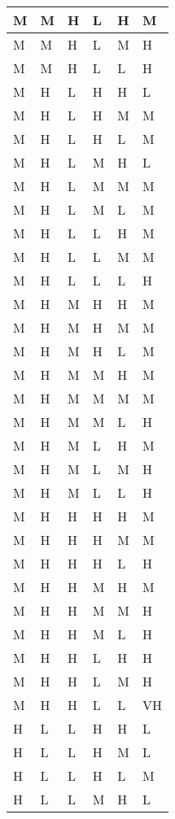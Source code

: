 \begin{center}
\begin{longtable}{| l | l | l | l | l | l |}
    M & M & H & L & H & M \\ \hline 
    M & M & H & L & M & H \\ \hline 
    M & M & H & L & L & H \\ \hline 
    M & H & L & H & H & L \\ \hline 
    M & H & L & H & M & M \\ \hline 
    M & H & L & H & L & M \\ \hline 
    M & H & L & M & H & L \\ \hline 
    M & H & L & M & M & M \\ \hline 
    M & H & L & M & L & M \\ \hline 
    M & H & L & L & H & M \\ \hline 
    M & H & L & L & M & M \\ \hline 
    M & H & L & L & L & H \\ \hline 
    M & H & M & H & H & M \\ \hline 
    M & H & M & H & M & M \\ \hline 
    M & H & M & H & L & M \\ \hline 
    M & H & M & M & H & M \\ \hline 
    M & H & M & M & M & M \\ \hline 
    M & H & M & M & L & H \\ \hline 
    M & H & M & L & H & M \\ \hline 
    M & H & M & L & M & H \\ \hline 
    M & H & M & L & L & H \\ \hline 
    M & H & H & H & H & M \\ \hline 
    M & H & H & H & M & M \\ \hline 
    M & H & H & H & L & H \\ \hline 
    M & H & H & M & H & M \\ \hline 
    M & H & H & M & M & H \\ \hline 
    M & H & H & M & L & H \\ \hline 
    M & H & H & L & H & H \\ \hline 
    M & H & H & L & M & H \\ \hline 
    M & H & H & L & L & VH \\ \hline 
    H & L & L & H & H & L \\ \hline 
    H & L & L & H & M & L \\ \hline 
    H & L & L & H & L & M \\ \hline 
    H & L & L & M & H & L \\ \hline 

\end{longtable}
\end{center}
